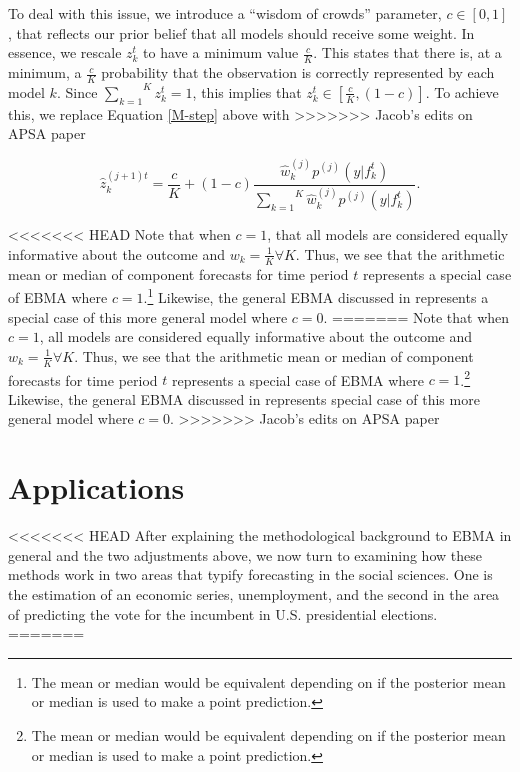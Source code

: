 \documentclass[12pt,fullpage,endnotes]{article}
\begin{document}
To deal with this issue, we introduce a ``wisdom of crowds''
parameter, $c \in [0,1]$, that reflects our prior belief that all
models should receive some weight.  In essence, we rescale $z^t_k$ to
have a minimum value $\frac{c}{K}$.  This states that there is, at a
minimum, a $\frac{c}{K}$ probability that the observation is correctly
represented by each model $k$.  Since
$\overset{K}{\underset{k=1}{\sum}} z_k^t = 1$, this implies that
$z_k^t \in [\frac{c}{K}, (1-c)]$.  To achieve this, we replace
Equation \ref{M-step} above with
>>>>>>> Jacob's edits on APSA paper

\begin{equation}
\hat{z}^{(j+1)t}_{k} = \frac{c}{K} + (1-c)\frac{\hat{w}^{(j)}_k
p^{(j)}(y|f_{k}^{t})}{\overset{K}{\underset{k=1}{\sum}}\hat{w}^{(j)}_kp^{(j)}(y|f_{k}^{t})}.
\end{equation}




<<<<<<< HEAD
Note that when $c=1$, that all models are considered equally
informative about the outcome and $w_k=\frac{1}{K} \forall K$. Thus, we see that the arithmetic mean or
median of component forecasts for time period $t$ represents a special
case of EBMA where $c=1$.\footnote{The mean or median would be
  equivalent depending on if the posterior mean or median is used to
  make a point prediction.}  Likewise, the general EBMA discussed in
\citet{mhw:2012} represents a special case of this more general
model where $c=0$.
=======
Note that when $c=1$, all models are considered equally informative
about the outcome and $w_k=\frac{1}{K} \forall K$. Thus, we see that
the arithmetic mean or median of component forecasts for time period
$t$ represents a special case of EBMA where $c=1$.\footnote{The mean
  or median would be equivalent depending on if the posterior mean or
  median is used to make a point prediction.}  Likewise, the general
EBMA discussed in \citet{mhw:2012} represents special case of this
more general model where $c=0$.
>>>>>>> Jacob's edits on APSA paper


\section{Applications}
\label{empirics}
<<<<<<< HEAD
After explaining the methodological background to EBMA in general and the two adjustments above, we now turn to examining how these methods work in two areas that typify forecasting in
the social sciences. One is the estimation of an economic series, unemployment, and the second in the area of predicting the vote for the incumbent in U.S. presidential elections.
=======
\end{document}
